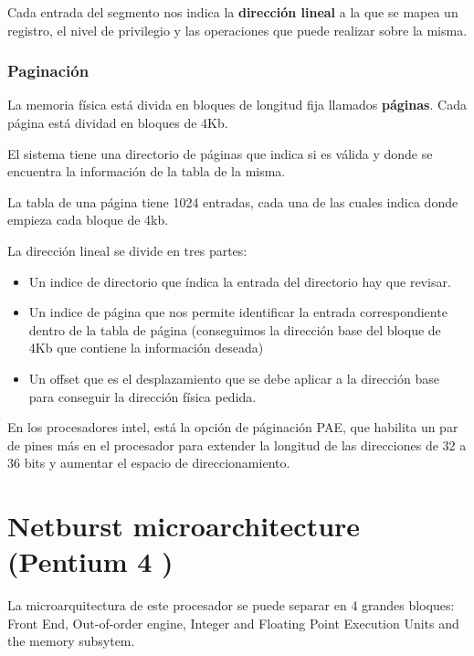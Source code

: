 Cada entrada del segmento nos indica la \textbf{dirección lineal} a la que se mapea un registro, el nivel de privilegio y las operaciones que puede realizar sobre la misma.

\subsubsection{Paginación}
La memoria física está divida en bloques de longitud fija llamados \textbf{páginas}. Cada página está dividad en bloques de 4Kb.

El sistema tiene una directorio de páginas que indica si es válida y donde se encuentra la información de la tabla de la misma.

La tabla de una página tiene 1024 entradas, cada una de las cuales indica donde empieza cada bloque de 4kb.

La dirección lineal se divide en tres partes: 
\begin{itemize}
	\item Un indice de directorio que índica la entrada del directorio hay que revisar.
	\item Un indice de página que nos permite identificar la entrada correspondiente dentro de la tabla de página (conseguimos la dirección base del bloque de 4Kb que contiene la información deseada)
	\item Un offset que es el desplazamiento que se debe aplicar a la dirección base para conseguir la dirección física pedida.
\end{itemize}

En los procesadores intel, está la opción de páginación PAE, que habilita un par de pines más en el procesador para extender la longitud de las direcciones de 32 a 36 bits y aumentar el espacio de direccionamiento.

\section{Netburst microarchitecture (Pentium 4 \cite{Sager01themicroarchitecture})}
La microarquitectura de este procesador se puede separar en 4 grandes bloques: Front End, Out-of-order engine, Integer and Floating Point Execution Units and the memory subsytem.


